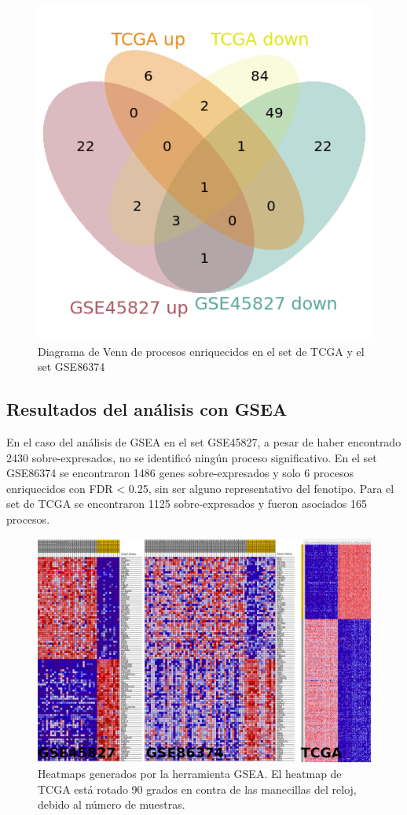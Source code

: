 \documentclass{article}
\begin{document}
\begin{figure}[ht!]
\centering
\includegraphics[scale=1.8]{../figures/all_venn.png}
\caption{Diagrama de Venn de procesos enriquecidos en el set de TCGA y el set GSE86374}
\label{fig:venn}
\end{figure}


\subsection*{Resultados del análisis con GSEA}
En el caso del análisis de GSEA en el set GSE45827, a pesar de haber encontrado 2430 sobre-expresados, no se identificó ningún proceso significativo. En el set GSE86374 se encontraron 1486 genes sobre-expresados y solo 6 procesos enriquecidos con FDR < 0.25, sin ser alguno representativo del fenotipo. Para el set de TCGA se encontraron 1125 sobre-expresados y fueron asociados 165 procesos. 

\begin{figure}[ht!]
\centering
\includegraphics[scale=0.23]{../figures/heatmaps_gsea.png}
\caption{Heatmaps generados por la herramienta GSEA. El heatmap de TCGA está rotado 90 grados en contra de las manecillas del reloj, debido al número de muestras.}
\label{fig:gseah}
\end{figure}
\end{document}

